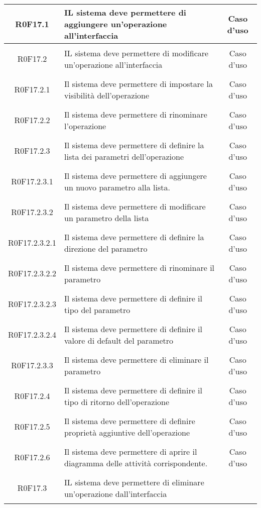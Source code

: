 \documentclass[../AnalisiDeiRequisiti.tex]{subfiles}
\begin{document}
\begin{longtable}{|c|>{\centering}p{7cm}|c|}
\hypertarget{R0F17.1}{R0F17.1} & IL sistema deve permettere di aggiungere un'operazione all'interfaccia & Caso d'uso \\ \hline
\hypertarget{R0F17.2}{R0F17.2} & IL sistema deve permettere di modificare un'operazione all'interfaccia & Caso d'uso \\ \hline
\hypertarget{R0F17.2.1}{R0F17.2.1} & Il sistema deve permettere di impostare la visibilità dell'operazione & Caso d'uso \\ \hline
\hypertarget{R0F17.2.2}{R0F17.2.2} & Il sistema deve permettere di rinominare l'operazione & Caso d'uso \\ \hline
\hypertarget{R0F17.2.3}{R0F17.2.3} & Il sistema deve permettere di definire la lista dei parametri dell'operazione & Caso d'uso \\ \hline
\hypertarget{R0F17.2.3.1}{R0F17.2.3.1} & Il sistema deve permettere di aggiungere un nuovo parametro alla lista. & Caso d'uso \\ \hline
\hypertarget{R0F17.2.3.2}{R0F17.2.3.2} & Il sistema deve permettere di modificare un parametro della lista & Caso d'uso \\ \hline
\hypertarget{R0F17.2.3.2.1}{R0F17.2.3.2.1} & Il sistema deve permettere di definire la direzione del parametro & Caso d'uso \\ \hline
\hypertarget{R0F17.2.3.2.2}{R0F17.2.3.2.2} & Il sistema deve permettere di rinominare il parametro & Caso d'uso \\ \hline
\hypertarget{R0F17.2.3.2.3}{R0F17.2.3.2.3} & Il sistema deve permettere di definire il tipo del parametro & Caso d'uso \\ \hline
\hypertarget{R0F17.2.3.2.4}{R0F17.2.3.2.4} & Il sistema deve permettere di definire il valore di default del parametro & Caso d'uso \\ \hline
\hypertarget{R0F17.2.3.3}{R0F17.2.3.3} & Il sistema deve permettere di eliminare il parametro & Caso d'uso \\ \hline
\hypertarget{R0F17.2.4}{R0F17.2.4} & Il sistema deve permettere di definire il tipo di ritorno dell'operazione & Caso d'uso \\ \hline
\hypertarget{R0F17.2.5}{R0F17.2.5} & Il sistema deve permettere di definire proprietà aggiuntive dell'operazione & Caso d'uso \\ \hline
\hypertarget{R0F17.2.6}{R0F17.2.6} & Il sistema deve permettere di aprire il diagramma delle attività corrispondente. & Caso d'uso \\ \hline
\hypertarget{R0F17.3}{R0F17.3} & IL sistema deve permettere di eliminare un'operazione dall'interfaccia 


\end{longtable}
\end{document}
